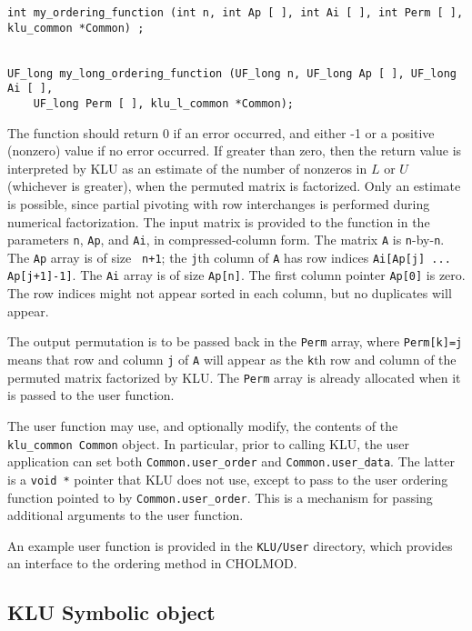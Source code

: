 \documentclass[11pt]{article}
\begin{document}
\begin{itemize}
{\footnotesize
\begin{verbatim}
int my_ordering_function (int n, int Ap [ ], int Ai [ ], int Perm [ ], klu_common *Common) ;


UF_long my_long_ordering_function (UF_long n, UF_long Ap [ ], UF_long Ai [ ],
    UF_long Perm [ ], klu_l_common *Common);
\end{verbatim}
}

The function should return 0 if an error occurred, and either -1 or a positive
(nonzero) value if no error occurred.  If greater than zero, then the return
value is interpreted by KLU as an estimate of the number of nonzeros in $L$ or
$U$ (whichever is greater), when the permuted matrix is factorized.  Only an
estimate is possible, since partial pivoting with row interchanges is performed
during numerical factorization.  The input matrix is provided to the function
in the parameters {\tt n}, {\tt Ap}, and {\tt Ai}, in compressed-column form.
The matrix {\tt A} is {\tt n}-by-{\tt n}.  The {\tt Ap} array is of size {\tt
n+1}; the {\tt j}th column of {\tt A} has row indices {\tt Ai[Ap[j] ...
Ap[j+1]-1]}.  The {\tt Ai} array is of size {\tt Ap[n]}.  The first column
pointer {\tt Ap[0]} is zero.  The row indices might not appear sorted in each
column, but no duplicates will appear.

The output permutation is to be passed back in the {\tt Perm} array, where
{\tt Perm[k]=j} means that row and column {\tt j} of {\tt A} will appear as
the {\tt k}th row and column of the permuted matrix factorized by KLU.  The
{\tt Perm} array is already allocated when it is passed to the user function.

The user function may use, and optionally modify, the contents of the {\tt
klu\_common Common} object.  In particular, prior to calling KLU, the user
application can set both {\tt Common.user\_order} and {\tt Common.user\_data}.
The latter is a {\tt void *} pointer that KLU does not use, except to pass to
the user ordering function pointed to by {\tt Common.user\_order}.  This is a
mechanism for passing additional arguments to the user function.

An example user function is provided in the {\tt KLU/User} directory, which
provides an interface to the ordering method in CHOLMOD.

\end{itemize}

\subsection{KLU Symbolic object}
\end{document}
